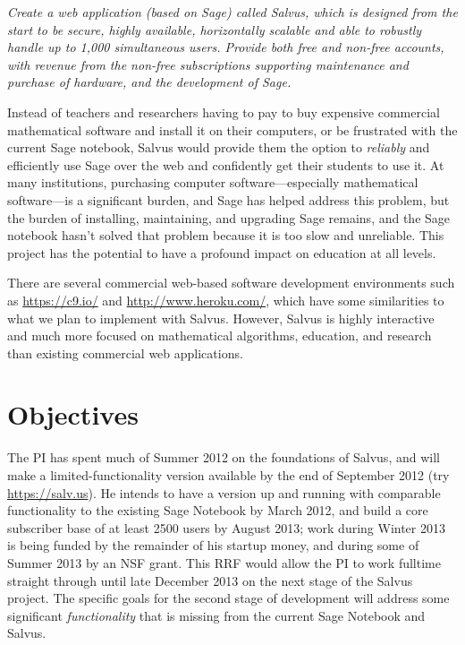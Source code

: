 \documentclass[11pt]{article}
\begin{document}
 {\em Create a web application (based on Sage)
  called Salvus, which is designed from the start to be secure, highly
  available, horizontally scalable and able to robustly handle up to
  1,000 simultaneous users.  Provide both free and non-free accounts,
  with revenue from the non-free subscriptions supporting maintenance
  and purchase of hardware, and the development of Sage.}

Instead of teachers and researchers having to pay to buy expensive
commercial mathematical software and install it on their computers, or
be frustrated with the current Sage notebook, Salvus would provide
them the option to {\em reliably} and efficiently use Sage over the
web and confidently get their students to use it.  At many
institutions, purchasing computer software---especially mathematical
software---is a significant burden, and Sage has helped address this
problem, but the burden of installing, maintaining, and upgrading Sage
remains, and the Sage notebook hasn't solved that problem because it
is too slow and unreliable.  This project has the potential to have a
profound impact on education at all levels.

There are several commercial web-based software development
environments such as \url{https://c9.io/} and
\url{http://www.heroku.com/}, which have some similarities to what we
plan to implement with Salvus.  However, Salvus is highly interactive
and much more focused on mathematical algorithms, education, and
research than existing commercial web applications.

\section{Objectives}

The PI has spent much of Summer 2012 on the foundations of Salvus, and
will make a limited-functionality version available by the end of
September 2012 (try \url{https://salv.us}).  He intends to have a
version up and running with comparable functionality to the existing
Sage Notebook by March 2012, and build a core subscriber base of at
least 2500 users by August 2013; work during Winter 2013 is being
funded by the remainder of his startup money, and during some of
Summer 2013 by an NSF grant.  This RRF would allow the PI to work
fulltime straight through until late December 2013 on the next stage
of the Salvus project. The specific goals for the second stage of
development will address some significant {\em functionality} that is
missing from the current Sage Notebook and Salvus.
\end{document}
